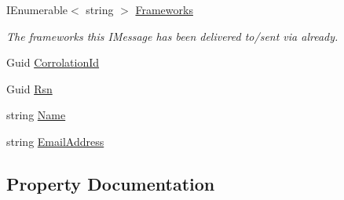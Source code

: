 \begin{DoxyCompactItemize}
I\+Enumerable$<$ string $>$ \hyperlink{classCqrs_1_1WebApi_1_1HelpPageConfig_1_1UserCreatedEvent_a6a5b798621c76be8474b1189ed1c9608_a6a5b798621c76be8474b1189ed1c9608}{Frameworks}
\begin{DoxyCompactList}\small\item\em The frameworks this I\+Message has been delivered to/sent via already. \end{DoxyCompactList}\item 
Guid \hyperlink{classCqrs_1_1WebApi_1_1HelpPageConfig_1_1UserCreatedEvent_a180187e5f4bbecad7b713efa3df64287_a180187e5f4bbecad7b713efa3df64287}{Corrolation\+Id}
\item 
Guid \hyperlink{classCqrs_1_1WebApi_1_1HelpPageConfig_1_1UserCreatedEvent_a5921e34dd4ceb0222c5d676d5ec280c4_a5921e34dd4ceb0222c5d676d5ec280c4}{Rsn}
\item 
string \hyperlink{classCqrs_1_1WebApi_1_1HelpPageConfig_1_1UserCreatedEvent_a7f2d8b02965bf47c010f7f85ae70df7e_a7f2d8b02965bf47c010f7f85ae70df7e}{Name}
\item 
string \hyperlink{classCqrs_1_1WebApi_1_1HelpPageConfig_1_1UserCreatedEvent_a178a10218a8cdcc980ee9d7588970a4a_a178a10218a8cdcc980ee9d7588970a4a}{Email\+Address}
\end{DoxyCompactItemize}


\subsection{Property Documentation}
\mbox{\label{classCqrs_1_1WebApi_1_1HelpPageConfig_1_1UserCreatedEvent_aa8d10ff30ee35f23533da85c0dac8d88_aa8d10ff30ee35f23533da85c0dac8d88}} 
